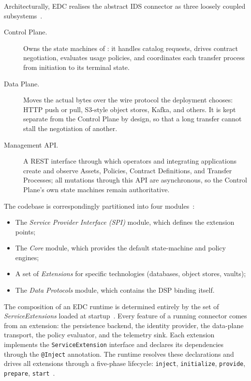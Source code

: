Architecturally, EDC realises the abstract IDS connector as three loosely coupled subsystems~\citep{eclipseEdcDocumentation, IDS4.0}.

\begin{description}
    \item[Control Plane.] Owns the state machines of : it handles catalog requests, drives contract negotiation, evaluates usage policies, and coordinates each transfer process from initiation to its terminal state.
    \item[Data Plane.] Moves the actual bytes over the wire protocol the deployment chooses: HTTP push or pull, S3-style object stores, Kafka, and others. It is kept separate from the Control Plane by design, so that a long transfer cannot stall the negotiation of another.
    \item[Management API.] A REST interface through which operators and integrating applications create and observe Assets, Policies, Contract Definitions, and Transfer Processes; all mutations through this API are asynchronous, so the Control Plane's own state machines remain authoritative.
\end{description}

The codebase is correspondingly partitioned into four modules~\citep{eclipseEdcDocumentation}:

\begin{itemize}
    \item The \emph{Service Provider Interface (SPI)} module, which defines the extension points;
    \item The \emph{Core} module, which provides the default state-machine and policy engines;
    \item A set of \emph{Extensions} for specific technologies (databases, object stores, vaults);
    \item The \emph{Data Protocols} module, which contains the DSP binding itself.
\end{itemize}


The composition of an EDC runtime is determined entirely by the set of \emph{ServiceExtensions} loaded at startup~\citep{eclipseEdcDocumentation}. Every feature of a running connector comes from an extension: the persistence backend, the identity provider, the data-plane transport, the policy evaluator, and the telemetry sink. Each extension implements the \texttt{ServiceExtension} interface and declares its dependencies through the \texttt{@Inject} annotation. The runtime resolves these declarations and drives all extensions through a five-phase lifecycle: \texttt{inject}, \texttt{initialize}, \texttt{provide}, \texttt{prepare}, \texttt{start}~\citep{eclipseEdcDocumentation}.

